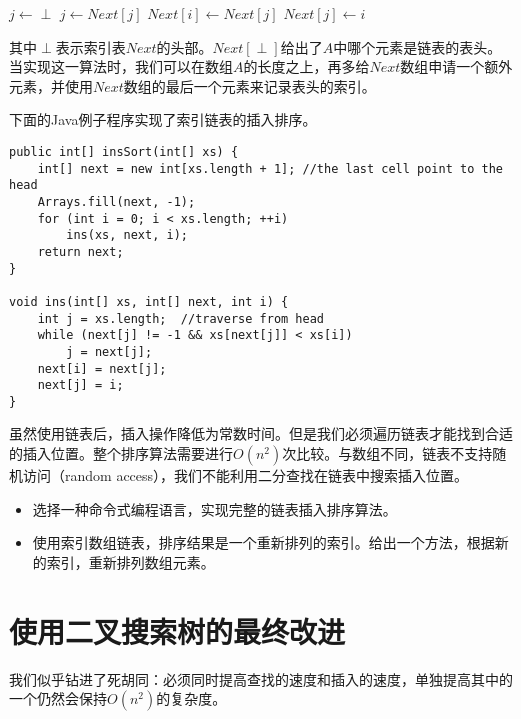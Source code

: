 \documentclass[UTF8]{article}
\begin{document}
\begin{algorithmic}[1]
  \State $j \gets \perp$
    \State $j \gets Next[j]$
  \EndWhile
  \State $Next[i] \gets Next[j]$
  \State $Next[j] \gets i$
\EndFunction
\end{algorithmic}

其中$\perp$表示索引表$Next$的头部。$Next[\perp]$给出了$A$中哪个元素是链表的表头。当实现这一算法时，我们可以在数组$A$的长度之上，再多给$Next$数组申请一个额外元素，并使用$Next$数组的最后一个元素来记录表头的索引。

下面的Java例子程序实现了索引链表的插入排序。

\lstset{language=Java}
\begin{lstlisting}
public int[] insSort(int[] xs) {
    int[] next = new int[xs.length + 1]; //the last cell point to the head
    Arrays.fill(next, -1);
    for (int i = 0; i < xs.length; ++i)
        ins(xs, next, i);
    return next;
}

void ins(int[] xs, int[] next, int i) {
    int j = xs.length;  //traverse from head
    while (next[j] != -1 && xs[next[j]] < xs[i])
        j = next[j];
    next[i] = next[j];
    next[j] = i;
}
\end{lstlisting}

虽然使用链表后，插入操作降低为常数时间。但是我们必须遍历链表才能找到合适的插入位置。整个排序算法需要进行$O(n^2)$次比较。与数组不同，链表不支持随机访问（random access），我们不能利用二分查找在链表中搜索插入位置。

\begin{Exercise}
\begin{itemize}
\item 选择一种命令式编程语言，实现完整的链表插入排序算法。
\item 使用索引数组链表，排序结果是一个重新排列的索引。给出一个方法，根据新的索引，重新排列数组元素。
\end{itemize}
\end{Exercise}


\section{使用二叉搜索树的最终改进}

我们似乎钻进了死胡同：必须同时提高查找的速度和插入的速度，单独提高其中的一个仍然会保持$O(n^2)$的复杂度。
\end{document}
